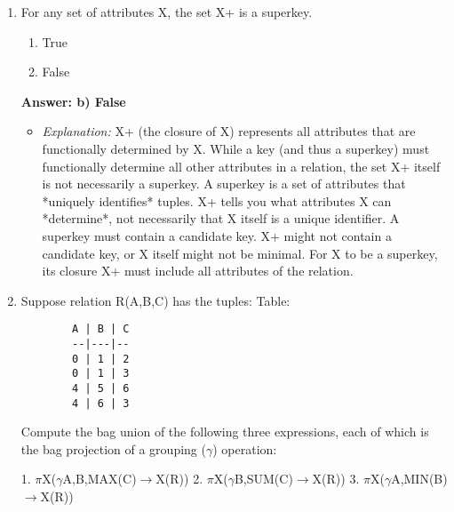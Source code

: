 \documentclass{article}
\begin{document}
\begin{enumerate}[label=\textbf{Question \arabic*.}]
    \item For any set of attributes X, the set X+ is a superkey.
        \begin{enumerate}[label=\alph*)]
            \item True
            \item False
        \end{enumerate}
        \textbf{Answer: b) False}
        \begin{itemize}
            \item \textit{Explanation:} X+ (the closure of X) represents all attributes that are functionally determined by X. While a key (and thus a superkey) must functionally determine all other attributes in a relation, the set X+ itself is not necessarily a superkey. A superkey is a set of attributes that *uniquely identifies* tuples. X+ tells you what attributes X can *determine*, not necessarily that X itself is a unique identifier. A superkey must contain a candidate key. X+ might not contain a candidate key, or X itself might not be minimal. For X to be a superkey, its closure X+ must include all attributes of the relation.
        \end{itemize}
    
    \item Suppose relation R(A,B,C) has the tuples:
        Table:
        \begin{verbatim}
        A | B | C
        --|---|--
        0 | 1 | 2
        0 | 1 | 3
        4 | 5 | 6
        4 | 6 | 3
        \end{verbatim}
        Compute the bag union of the following three expressions, each of which is the bag projection of a grouping ($\gamma$) operation:
    
        1. $\pi$X($\gamma$A,B,MAX(C)$\rightarrow$X(R))
        2. $\pi$X($\gamma$B,SUM(C)$\rightarrow$X(R))
        3. $\pi$X($\gamma$A,MIN(B)$\rightarrow$X(R))
    

\end{enumerate}
\end{document}

